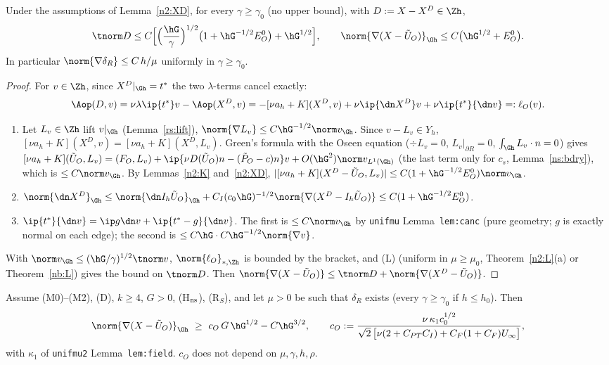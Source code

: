 \begin{theorem}\label{n2:up}
Under the assumptions of Lemma~\ref{n2:XD}, for every $\gamma\ge\gamma_0$ (no upper bound), with $D:=X-X^D\in\Zh$,
\[
\tnorm D\le C\Bigl[\Bigl(\frac\hG\gamma\Bigr)^{1/2}\bigl(1+\hG^{-1/2}E^0_O\bigr)+\hG^{1/2}\Bigr],\qquad
\norm{\nabla(X-\tilde U_O)}_{\Oh}\le C\bigl(\hG^{1/2}+E^0_O\bigr).
\]
In particular $\norm{\nabla\delta_R}\le C\,h/\mu$ uniformly in $\gamma\ge\gamma_0$.
\end{theorem}

\begin{proof}
For $v\in\Zh$, since $X^D|_{\Gh}=t^\ast$ the two $\lambda$-terms cancel exactly:
\[
\Aop(D,v)=\nu\lambda\ip{t^\ast}v-\Aop(X^D,v)=-[\nu a_h+K](X^D,v)+\nu\ip{\dn X^D}v+\nu\ip{t^\ast}{\dn v}=:\ell_O(v).
\]
\begin{enumerate}
\item Let $L_v\in\Zh$ lift $v|_{\Gh}$ (Lemma~\ref{rs:lift}), $\norm{\nabla L_v}\le C\hG^{-1/2}\norm v_{\Gh}$. Since $v-L_v\in Y_h$,
$[\nu a_h+K](X^D,v)=[\nu a_h+K](X^D,L_v)$. Green's formula with the Oseen equation ($\div L_v=0$, $L_v|_{\partial R}=0$, $\int_{\Gh}L_v\cdot n=0$) gives
$[\nu a_h+K](\tilde U_O,L_v)=(F_O,L_v)+\ip{\nu D(\tilde U_O)n-(\tilde P_O-c)n}v+O(\hG^2)\norm v_{L^1(\Gh)}$ (the last term only for $c_s$, Lemma~\ref{ns:bdry}),
which is $\le C\norm v_{\Gh}$. By Lemmas~\ref{n2:K} and~\ref{n2:XD}, $|[\nu a_h+K](X^D-\tilde U_O,L_v)|\le C(1+\hG^{-1/2}E^0_O)\norm v_{\Gh}$.
\item $\norm{\dn X^D}_{\Gh}\le\norm{\dn I_h\tilde U_O}_{\Gh}+C_I(c_0\hG)^{-1/2}\norm{\nabla(X^D-I_h\tilde U_O)}\le C(1+\hG^{-1/2}E^0_O)$.
\item $\ip{t^\ast}{\dn v}=\ip g{\dn v}+\ip{t^\ast-g}{\dn v}$. The first is $\le C\norm v_{\Gh}$ by \texttt{unifmu} Lemma~\texttt{lem:canc} (pure geometry; $g$ is exactly
normal on each edge); the second is $\le C\hG\cdot C\hG^{-1/2}\norm{\nabla v}$.
\end{enumerate}
With $\norm v_{\Gh}\le(\hG/\gamma)^{1/2}\tnorm v$, $\norm{\ell_O}_{\ast,\Zh}$ is bounded by the bracket, and (L) (uniform in $\mu\ge\mu_0$, Theorem~\ref{n2:L}(a)
or Theorem~\ref{nb:L}) gives the bound on $\tnorm D$. Then $\norm{\nabla(X-\tilde U_O)}\le\tnorm D+\norm{\nabla(X^D-\tilde U_O)}$.
\end{proof}

\begin{theorem}\label{n2:low}
Assume (M0)--(M2), (D), $k\ge4$, $G>0$, (H$_{\rm ns}$), (R$_S$), and let $\mu>0$ be such that $\delta_R$ exists (every $\gamma\ge\gamma_0$ if $h\le h_0$). Then
\[
\norm{\nabla(X-\tilde U_O)}_{\Oh}\ \ge\ c_O\,G\,\hG^{1/2}-C\hG^{3/2},\qquad
c_O:=\frac{\nu\,\kappa_1c_0^{1/2}}{\sqrt2\,\bigl[\nu(2+C_{PT}C_I)+C_F(1+C_F)U_\infty\bigr]},
\]
with $\kappa_1$ of \texttt{unifmu2} Lemma~\texttt{lem:field}. $c_O$ does not depend on $\mu,\gamma,h,\rho$.
\end{theorem}

